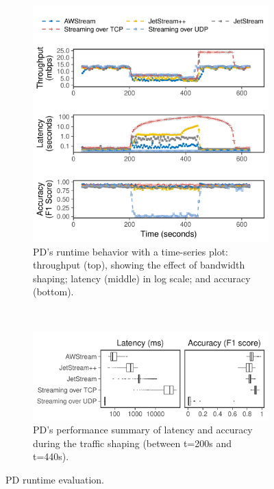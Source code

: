 \begin{figure}[t]
  \begin{subfigure}[t]{\columnwidth}
    \centering
    \includegraphics[width=\columnwidth]{figures/runtime_mot-timeseries.pdf}
    \caption{PD's runtime behavior with a time-series plot: throughput (top),
      showing the effect of bandwidth shaping; latency (middle) in log scale;
      and accuracy (bottom).}
    \label{fig:pd-runtime-timeseries}
  \end{subfigure}
  \vspace{1em}
  \\
  \begin{subfigure}[t]{\columnwidth}
    \centering
    \includegraphics[width=\columnwidth]{figures/runtime_mot-boxplot.pdf}
    \caption{PD's performance summary of latency and accuracy during the traffic
      shaping (between t=200s and t=440s).}
\label{fig:pd-runtime-boxplot}
  \end{subfigure}
  \caption{PD runtime evaluation.}
  \label{fig:pd-runtime}
\end{figure}

